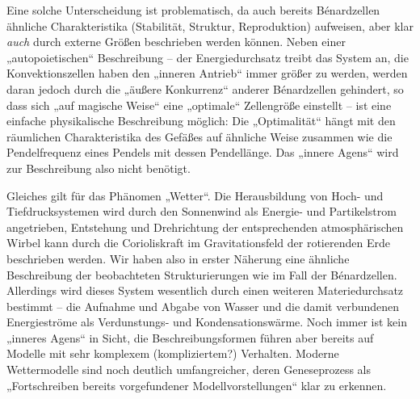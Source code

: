\documentclass[11pt,a4paper]{article}
\begin{document}
Eine solche Unterscheidung ist problematisch, da auch bereits
Bénardzellen ähnliche Charakteristika (Stabilität, Struktur,
Reproduktion) aufweisen, aber klar \emph{auch} durch externe Größen
beschrieben werden können. Neben einer „autopoietischen“ Beschreibung
-- der Energiedurchsatz treibt das System an, die Konvektionszellen haben
den „inneren Antrieb“ immer größer zu werden, werden daran jedoch
durch die „äußere Konkurrenz“ anderer Bénardzellen gehindert, so dass
sich „auf magische Weise“ eine „optimale“ Zellengröße einstellt --
ist eine einfache physikalische Beschreibung möglich: Die
„Optimalität“ hängt mit den räumlichen Charakteristika des Gefäßes auf
ähnliche Weise zusammen wie die Pendelfrequenz eines Pendels mit dessen
Pendellänge. Das „innere Agens“ wird zur Beschreibung also nicht
benötigt.

Gleiches gilt für das Phänomen „Wetter“. Die Herausbildung von Hoch- und
Tiefdrucksystemen wird durch den Sonnenwind als Energie- und Partikelstrom
angetrieben, Entstehung und Drehrichtung der entsprechenden atmosphärischen
Wirbel kann durch die Corioliskraft im Gravitationsfeld der rotierenden Erde
beschrieben werden. Wir haben also in erster Näherung eine ähnliche
Beschreibung der beobachteten Strukturierungen wie im Fall der
Bénardzellen. Allerdings wird dieses System wesentlich durch einen weiteren
Materiedurchsatz bestimmt -- die Aufnahme und Abgabe von Wasser und die damit
verbundenen Energieströme als Verdunstungs- und Kondensationswärme. Noch immer
ist kein „inneres Agens“ in Sicht, die Beschreibungsformen führen aber bereits
auf Modelle mit sehr komplexem (kompliziertem?) Verhalten. Moderne
Wettermodelle sind noch deutlich umfangreicher, deren Geneseprozess als
„Fortschreiben bereits vorgefundener Modellvorstellungen“ klar zu erkennen.
\end{document}
